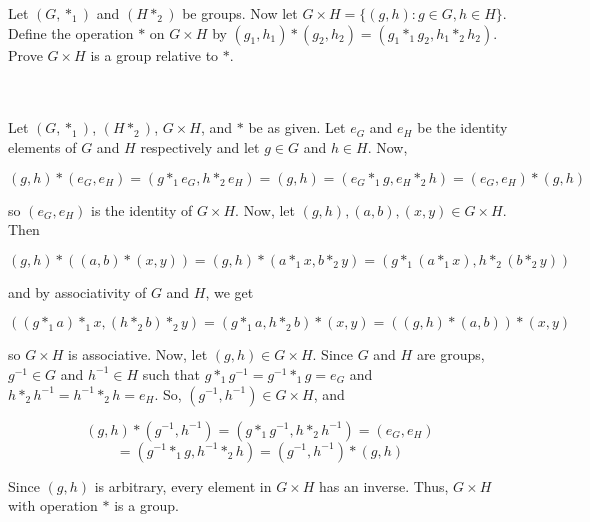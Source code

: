 Let $(G,*_1)$ and $(H*_2)$ be groups. Now let $G\times H=\{(g,h):g\in G, h\in H\}$. Define the operation
$*$ on $G\times H$ by $(g_1,h_1)*(g_2,h_2)=(g_1*_1g_2,h_1*_2h_2)$. Prove $G\times H$ is a group relative
to $*$.\\\\

\begin{solution}\renewcommand{\qedsymbol}{}\ \\
    Let $(G,*_1)$, $(H*_2)$, $G\times H$, and $*$ be as given. Let $e_G$ and $e_H$ be the identity
    elements of $G$ and $H$ respectively and let $g\in G$ and $h\in H$. Now,
    
    $$(g,h)*(e_G,e_H)=(g*_1e_G,h*_2e_H)=(g,h)=(e_G*_1g,e_H*_2h)=(e_G,e_H)*(g,h)$$
    
    so $(e_G,e_H)$ is the identity of $G\times H$. Now, let $(g,h),(a,b),(x,y)\in G\times H$. Then
    
    $$(g,h)*((a,b)*(x,y))=(g,h)*(a*_1x,b*_2y)=(g*_1(a*_1x),h*_2(b*_2y))$$
    
    and by associativity of $G$ and $H$, we get
    
    $$((g*_1a)*_1x,(h*_2b)*_2y)=(g*_1a,h*_2b)*(x,y)=((g,h)*(a,b))*(x,y)$$
    
    so $G\times H$ is associative. Now, let $(g,h)\in G\times H$. Since $G$ and $H$ are groups,
    $g^{-1}\in G$ and $h^{-1}\in H$ such that $g*_1g^{-1}=g^{-1}*_1g=e_G$ and
    $h*_2h^{-1}=h^{-1}*_2h=e_H$. So, $(g^{-1},h^{-1})\in G\times H$, and
    
    $$(g,h)*(g^{-1},h^{-1})=(g*_1g^{-1},h*_2h^{-1})=(e_G,e_H)$$
    $$=(g^{-1}*_1g,h^{-1}*_2h)=(g^{-1},h^{-1})*(g,h)$$
    
    Since $(g,h)$ is arbitrary, every element in $G\times H$ has an inverse. Thus, $G\times H$ with
    operation $*$ is a group.

\end{solution}